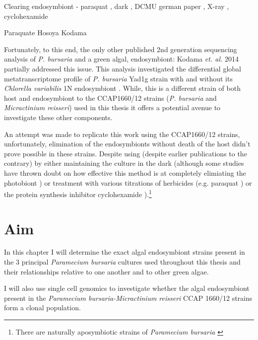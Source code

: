 Clearing endosymbiont - paraquat \citep{Hosoya1995a}, dark \citep{Karakashian1963}, DCMU german paper \citep{Reisser1976},
X-ray \citep{Wichterman1948}, cyclohexamide \citep{Weis1984,Kodama2007}


Paraquate Hosoya 
Kodama


Fortunately, to this end, the only other published 2nd generation sequencing analysis of \textit{P. bursaria} and a green algal,
endosymbiont: Kodama \textit{et. al.} 2014 \citep{Kodama2014} partially addressed this issue.  This analysis investigated 
the differential global metatranscriptome profile of \textit{P. bursaria} Yad1g strain with and without its \textit{Chlorella variabilis} 1N endosymbiont 
\citep{Kodama2014}.   While, this is a different strain of both host and endosymbiont to the CCAP1660/12 strains (\textit{P. bursaria} and \textit{Micractinium reisseri}) 
used in this thesis it offers a potential avenue to investigate these other components.


An attempt was made to replicate this work using the CCAP1660/12 strains, unfortunately, elimination of the endosymbionts without death of the host
didn't prove possible in these strains.  Despite using 
(despite earlier publications to the contrary) by either maintaining the culture in the dark \citep{Siegel1960} (although some studies have thrown doubt on
        how effective this method is at completely elimiating the photobiont \citep{Tanaka2002}) or treatment with various titrations of herbicides 
            (e.g. paraquat \citep{Hosoya1995a}) or the protein synthesis inhibitor cyclohexamide \citep{weis1984effect}).\footnote{
        There are naturally aposymbiotic strains of \textit{Paramecium bursaria} \citep{Tonooka2002a}}






\section{Aim}

In this chapter I will determine the exact algal endosymbiont strains present
in the 3 principal \textit{Paramecium bursaria} cultures used throughout
this thesis and their relationships relative to one another and to
other green algae.

I will also use single cell genomics to investigate whether the algal
endosymbiont present in the \textit{Paramecium bursaria-Micractinium reisseri}
CCAP 1660/12 strains form a clonal population. 

